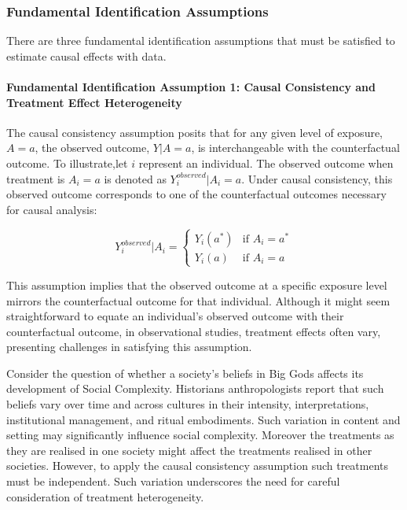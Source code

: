 \documentclass[
  singlecolumn,
  9pt]{article}
\let\oldparagraph\paragraph
\renewcommand{\paragraph}[1]{\oldparagraph{#1}\mbox{}}
\begin{document}
\subsubsection{Fundamental Identification
Assumptions}\label{fundamental-identification-assumptions}

There are three fundamental identification assumptions that must be
satisfied to estimate causal effects with data.

\paragraph{Fundamental Identification Assumption 1: Causal Consistency
and Treatment Effect
Heterogeneity}\label{fundamental-identification-assumption-1-causal-consistency-and-treatment-effect-heterogeneity}

The causal consistency assumption posits that for any given level of
exposure, \(A=a\), the observed outcome, \(Y|A=a\), is interchangeable
with the counterfactual outcome. To illustrate,let \(i\) represent an
individual. The observed outcome when treatment is \(A_i = a\) is
denoted as \(Y_i^{observed}|A_i = a\). Under causal consistency, this
observed outcome corresponds to one of the counterfactual outcomes
necessary for causal analysis:

\[
Y_i^{observed}|A_i = 
\begin{cases} 
Y_i(a^*) & \text{if } A_i = a^* \\
Y_i(a) & \text{if } A_i = a
\end{cases}
\]

This assumption implies that the observed outcome at a specific exposure
level mirrors the counterfactual outcome for that individual. Although
it might seem straightforward to equate an individual's observed outcome
with their counterfactual outcome, in observational studies, treatment
effects often vary, presenting challenges in satisfying this assumption.

Consider the question of whether a society's beliefs in Big Gods affects
its development of Social Complexity. Historians anthropologists report
that such beliefs vary over time and across cultures in their intensity,
interpretations, institutional management, and ritual embodiments. Such
variation in content and setting may significantly influence social
complexity. Moreover the treatments as they are realised in one society
might affect the treatments realised in other societies. However, to
apply the causal consistency assumption such treatments must be
independent. Such variation underscores the need for careful
consideration of treatment heterogeneity.
\end{document}
